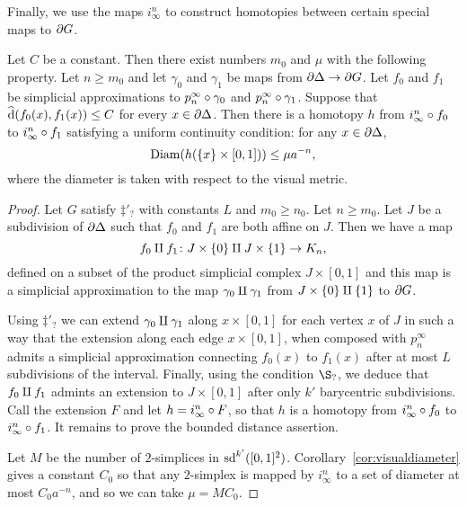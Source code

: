 \documentclass[a4paper]{article}
\begin{document}
Finally, we use the maps $i^n_\infty$ to construct homotopies between certain
special maps to $\partial G$.

\begin{proposition}\label{prop:basic_homotopies}
  Let $C$ be a constant. Then there exist numbers $m_0$ and $\mu$
  with the following property. Let $n \geq m_0$ and let $\gamma_0$ and
  $\gamma_1$ be maps from $\partial\Delta\to\partial G$. Let $f_0$ and $f_1$
  be simplicial approximations to $p^\infty_n\circ \gamma_0$ and
  $p^\infty_n\circ\gamma_1$. Suppose that $\operatorname{\widehat{d}}(f_0(x), f_1(x))\leq C$
  for every $x \in \partial \Delta$. Then there is a homotopy $h$ from
  $i^n_\infty\circ f_0$ to $i^n_\infty\circ f_1$ satisfying a uniform
  continuity condition: for any $x \in \partial\Delta$,
  \begin{equation*}
    \operatorname{Diam}(h(\{x\} \times [0,1])) \leq \mu a^{-n},
  \end{equation*}
  where the diameter is taken with respect to the visual metric.
\end{proposition}

\begin{proof}
  Let $G$ satisfy $\ddag'_?$ with constants $L$ and $m_0 \geq n_0$.
  Let $n \geq m_0$.  Let $J$ be a subdivision of $\partial\Delta$ such
  that $f_0$ and $f_1$ are both affine on $J$. Then we have a map 
  \begin{equation*}
    f_0 \amalg f_1 \colon J \times \{0\} \amalg J \times \{1\}
          \to K_n,
  \end{equation*}
  defined on a subset of the product simplicial complex $J \times [0,1]$ and
  this map is a simplicial approximation to the map $\gamma_0 \amalg
  \gamma_1$ from $J\times\{0\} \amalg \{1\}$ to $\partial G$. 
  
  Using $\ddag'_?$ we can extend $\gamma_0\amalg\gamma_1$ along $x
  \times [0,1]$ for each vertex $x$ of $J$ in such a way that the extension
  along each edge $x\times [0,1]$, when composed with $p^\infty_n$ admits a
  simplicial approximation connecting $f_0(x)$ to $f_1(x)$ after at most $L$
  subdivisions of the interval. Finally, using the condition $\S_?$, we deduce
  that $f_0 \amalg f_1$ admints an extension to $J \times [0,1]$ after
  only $k'$ barycentric subdivisions. Call the extension $F$ and let $h =
  i^n_\infty \circ F$, so that $h$ is a homotopy from $i^n_\infty\circ
  f_0$ to $i^n_\infty\circ f_1$. It remains to prove the bounded distance
  assertion.

  Let $M$ be the number of $2$-simplices in $\operatorname{sd}^{k'}([0,1]^2)$.
  Corollary~\ref{cor:visualdiameter} gives a constant $C_0$ so that any
  $2$-simplex is mapped by $i^n_\infty$ to a set of diameter at most $C_0
  a^{-n}$, and so we can take $\mu = MC_0$.
\end{proof}
\end{document}
